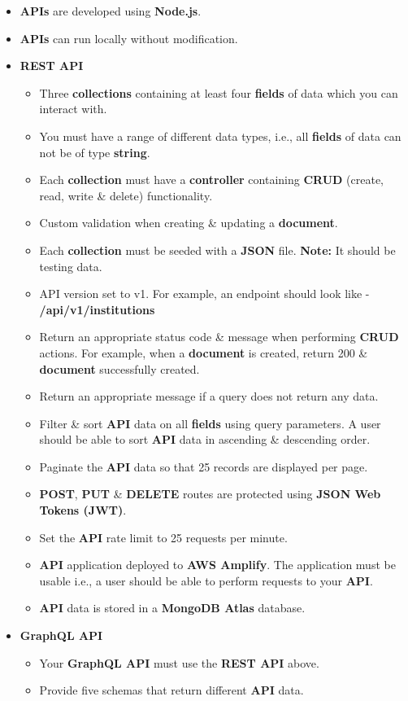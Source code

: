 \documentclass{article}
\begin{document}
\begin{itemize}
    \item \textbf{APIs} are developed using \textbf{Node.js}.
    \item \textbf{APIs} can run locally without modification.
    \item \textbf{REST API}
    \begin{itemize}
      \item Three \textbf{collections} containing at least four \textbf{fields} of data which you can interact with.  
      \item You must have a range of different data types, i.e., all \textbf{fields} of data can not be of type \textbf{string}.
      \item Each \textbf{collection} must have a \textbf{controller} containing \textbf{CRUD} (create, read, write \& delete) functionality. 
      \item Custom validation when creating \& updating a \textbf{document}.
      \item Each \textbf{collection} must be seeded with a \textbf{JSON} file. \textbf{Note:} It should be testing data.
      \item API version set to v1. For example, an endpoint should look like - \textbf{/api/v1/institutions}
      \item Return an appropriate status code \& message when performing \textbf{CRUD} actions. For example, when a \textbf{document} is created, return 200 \& \textbf{document} successfully created. 
      \item Return an appropriate message if a query does not return any data.
      \item Filter \& sort \textbf{API} data on all \textbf{fields} using query parameters. A user should be able to sort \textbf{API} data in ascending \& descending order.
      \item Paginate the \textbf{API} data so that 25 records are displayed per page.
      \item \textbf{POST}, \textbf{PUT} \& \textbf{DELETE} routes are protected using \textbf{JSON Web Tokens (JWT)}.
      \item Set the \textbf{API} rate limit to 25 requests per minute.
      \item \textbf{API} application deployed to \textbf{AWS Amplify}. The application must be usable i.e., a user should be able to perform requests to your \textbf{API}.
      \item \textbf{API} data is stored in a \textbf{MongoDB Atlas} database.
    \end{itemize}
    \item \textbf{GraphQL API}
    \begin{itemize}
      \item Your \textbf{GraphQL API} must use the \textbf{REST API} above.
      \item Provide five schemas that return different \textbf{API} data.
    \end{itemize}
\end{itemize}
\end{document}

